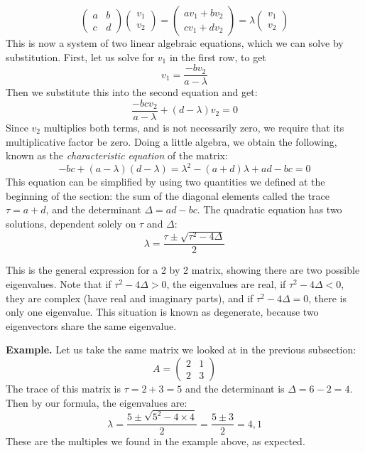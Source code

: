 \documentclass[
  letterpaper,
  DIV=11,
  numbers=noendperiod]{scrreprt}
\begin{document}
\[  \left(\begin{array}{cc}a & b \\c & d\end{array}\right)\left(\begin{array}{c}v_1 \\ v_2 \end{array}\right) = \left(\begin{array}{c}av_1 +b v_2\\ cv_1+ dv_2 \end{array}\right) = \lambda \left(\begin{array}{c}v_1 \\ v_2 \end{array}\right)  \]
This is now a system of two linear algebraic equations, which we can
solve by substitution. First, let us solve for \(v_1\) in the first row,
to get \[ v_1 = \frac{-bv_2}{a-\lambda}\] Then we substitute this into
the second equation and get:
\[\frac{-bcv_2}{a-\lambda} +(d-\lambda)v_2 = 0\] Since \(v_2\)
multiplies both terms, and is not necessarily zero, we require that its
multiplicative factor be zero. Doing a little algebra, we obtain the
following, known as the \emph{characteristic equation} of the matrix:
\[ -bc +(a-\lambda)(d-\lambda) = \lambda^2-(a+d)\lambda +ad-bc = 0\]
This equation can be simplified by using two quantities we defined at
the beginning of the section: the sum of the diagonal elements called
the trace \(\tau = a+d\), and the determinant \(\Delta = ad-bc\). The
quadratic equation has two solutions, dependent solely on \(\tau\) and
\(\Delta\): \[
\lambda = \frac{\tau \pm \sqrt{\tau^2-4\Delta}}{2}
\]

This is the general expression for a 2 by 2 matrix, showing there are
two possible eigenvalues. Note that if \(\tau^2-4\Delta>0\), the
eigenvalues are real, if \(\tau^2-4\Delta<0\), they are complex (have
real and imaginary parts), and if \(\tau^2-4\Delta=0\), there is only
one eigenvalue. This situation is known as degenerate, because two
eigenvectors share the same eigenvalue.

\textbf{Example.} Let us take the same matrix we looked at in the
previous subsection:
\[ A = \left(\begin{array}{cc}2 & 1 \\ 2& 3\end{array}\right)\] The
trace of this matrix is \(\tau = 2+3 =5\) and the determinant is
\(\Delta = 6 - 2 = 4\). Then by our formula, the eigenvalues are:
\[\lambda = \frac{5 \pm \sqrt{5^2-4 \times 4}}{2}  =  \frac{5 \pm 3}{2}  = 4, 1\]
These are the multiples we found in the example above, as expected.
\end{document}
